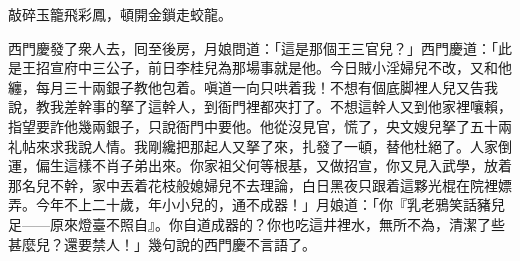 \begin{myquote} 
敲碎玉籠飛彩鳳，頓開金鎖走蛟龍。
\end{myquote} 

西門慶發了衆人去，囘至後房，月娘問道：「這是那個王三官兒？」西門慶道：「此是王招宣府中三公子，前日李桂兒為那場事就是他。{}今日賊小淫婦兒不改，又和他纏，每月三十兩銀子教他包着。嗔道一向只哄着我！不想有個底脚裡人兒又告我說，教我差幹事的拏了這幹人，到衙門裡都夾打了。不想這幹人又到他家裡嚷賴，指望要詐他幾兩銀子，只說衙門中要他。他從沒見官，慌了，央文嫂兒拏了五十兩礼帖來求我說人情。我剛纔把那起人又拏了來，扎發了一頓，替他杜絕了。人家倒運，偏生這樣不肖子弟出來。你家祖父何等根基，又做招宣，你又見入武學，放着那名兒不幹，家中丟着花枝般媳婦兒不去理論，白日黑夜只跟着這夥光棍在院裡嫖弄。今年不上二十歲，年小小兒的，通不成器！」{}月娘道：「你『乳老鴉笑話豬兒足——原來燈臺不照自』。你自道成器的？你也吃這井裡水，無所不為，清潔了些甚麼兒？還要禁人！」幾句說的西門慶不言語了。

